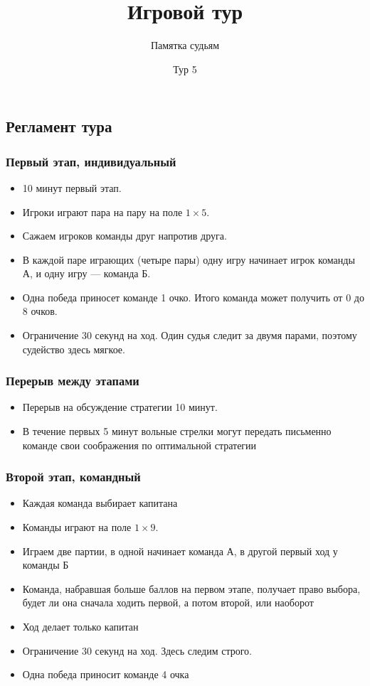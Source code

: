 \documentclass[10pt,russian,]{article}
\title{Игровой тур}
\author{Памятка судьям}
\date{Тур 5}
\providecommand{\tightlist}{%
  \setlength{\itemsep}{0pt}\setlength{\parskip}{0pt}}
\begin{document}
\maketitle

\subsection{Регламент тура}\label{-}

\subsubsection{Первый этап, индивидуальный}\label{--}

\begin{itemize}
\tightlist
\item
  10 минут первый этап.
\item
  Игроки играют пара на пару на поле \(1 \times 5\).
\item
  Сажаем игроков команды друг напротив друга.
\item
  В каждой паре играющих (четыре пары) одну игру начинает игрок команды
  А, и одну игру --- команда Б.
\item
  Одна победа приносет команде 1 очко. Итого команда может получить от 0
  до 8 очков.
\item
  Ограничение 30 секунд на ход. Один судья следит за двумя парами,
  поэтому судейство здесь мягкое.
\end{itemize}

\subsubsection{Перерыв между этапами}\label{--}

\begin{itemize}
\tightlist
\item
  Перерыв на обсуждение стратегии 10 минут.
\item
  В течение первых 5 минут вольные стрелки могут передать письменно
  команде свои соображения по оптимальной стратегии
\end{itemize}

\subsubsection{Второй этап, командный}\label{--}

\begin{itemize}
\tightlist
\item
  Каждая команда выбирает капитана
\item
  Команды играют на поле \(1 \times 9\).
\item
  Играем две партии, в одной начинает команда А, в другой первый ход у
  команды Б
\item
  Команда, набравшая больше баллов на первом этапе, получает право
  выбора, будет ли она сначала ходить первой, а потом второй, или
  наоборот
\item
  Ход делает только капитан
\item
  Ограничение 30 секунд на ход. Здесь следим строго.
\item
  Одна победа приносит команде 4 очка
\end{itemize}
\end{document}
